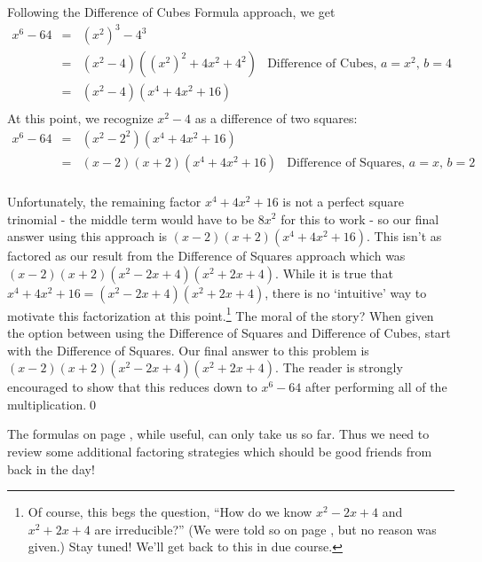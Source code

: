\documentclass{ximera}
\begin{document}
\begin{example}
\begin{explanation}
\begin{enumerate}
Following the Difference of Cubes Formula approach, we get \[ \begin{array}{rclr}

x^6 - 64 & = & (x^2)^3 - 4^3 & \\
         & = & (x^2 - 4)((x^2)^2 + 4x^2 + 4^2) & \text{Difference of Cubes, $a = x^2$, $b = 4$} \\ 
         & = & (x^2 - 4)(x^4 + 4x^2 + 16) & \\ 
\end{array} \] At this point, we recognize $x^2 - 4$ as a difference of two squares: \[ \begin{array}{rclr}

x^6 - 64 & = & (x^2 - 2^2)(x^4 + 4x^2 + 16)  & \\
         & = & (x-2)(x+2)(x^4 + 4x^2 + 16) & \text{Difference of Squares, $a = x$, $b = 2$} \\ 
 
\end{array} \]

Unfortunately, the remaining factor $x^4 + 4x^2 + 16$ is not a perfect square trinomial - the middle term would have to be $8x^2$ for this to work - so our final answer using this approach is $(x-2)(x+2)(x^4 + 4x^2 + 16)$.   This isn't as factored as our result from the Difference of Squares approach which was $(x-2)(x+2)(x^2-2x+4)(x^2+2x+4)$.  While it is true that $x^4 + 4x^2 + 16 = (x^2-2x+4)(x^2+2x+4)$, there is no `intuitive' way to motivate this factorization at this point.\footnote{Of course, this begs the question, ``How do we know $x^2-2x+4$ and $x^2+2x+4$ are irreducible?'' (We were told so on page \pageref{CommonFactoringFormulas}, but no reason was given.)  Stay tuned!  We'll get back to this in due course.}  The moral of the story?  When given the option between using the Difference of Squares and Difference of Cubes, start with the Difference of Squares.  Our final answer to this problem is  $(x-2)(x+2)(x^2-2x+4)(x^2+2x+4)$.  The reader is strongly encouraged to show that this reduces down to $x^6 - 64$ after performing all of the  multiplication.\qed

\end{enumerate}
\end{explanation}
\end{example}

The formulas on page \pageref{CommonFactoringFormulas}, while useful, can only take us so far.  Thus we need to review some additional factoring strategies which should be good friends from back in the day!
\end{document}
